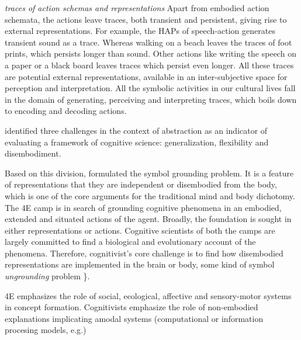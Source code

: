 \emph{traces of action schemas and representations} Apart from embodied action schemata, the actions leave traces, both transient and persistent, giving rise to external representations. For example, the HAPs of speech-action generates transient sound as a trace. Whereas walking on a beach leaves the traces of foot prints, which persists longer than sound. Other actions like writing the speech on a paper or a black board leaves traces which persist even longer. All these traces are potential external representations, available in an inter-subjective space for perception and interpretation. All the symbolic activities in our cultural lives fall in the domain of generating, perceiving and interpreting traces, which boils down to encoding and decoding actions.

\cite{dove-ungrounding} identified three challenges in the context of abstraction as an indicator of evaluating a framework of cognitive science: generalization, flexibility and disembodiment.  

Based on this division, \cite{harnad1990symbol} formulated the symbol grounding problem. It is a feature of representations that they are independent or disembodied from the body, which is one of the core arguments for the traditional mind and body dichotomy.  The 4E camp is in search of grounding cognitive phenomena in an embodied, extended and situated actions of the agent. Broadly, the foundation is sought in either representations or actions.   Cognitive scientists of both the camps are largely committed to find a biological and evolutionary account of the phenomena. Therefore, cognitivist's core challenge is to find how disembodied representations are implemented in the brain or body, some kind of symbol \textit{ungrounding} problem \}.

4E emphasizes the role of social, ecological, affective and sensory-motor systems in concept formation. 
Cognitivists emphasize the role of non-embodied explanations implicating amodal systems (computational or information procesing models, e.g.)



